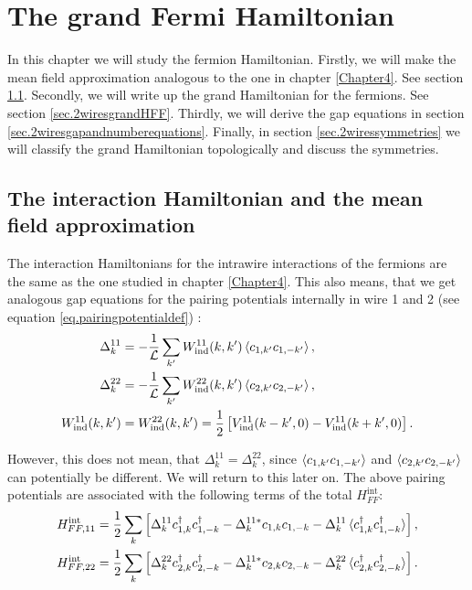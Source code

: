 
\chapter{The grand Fermi Hamiltonian} %

\label{Chapter9} %


In this chapter we will study the fermion Hamiltonian. Firstly, we will make the mean field approximation analogous to the one in chapter \ref{Chapter4}. See section \ref{sec.2wiresmeanfieldapproximation}. Secondly, we will write up the grand Hamiltonian for the fermions. See section \ref{sec.2wiresgrandHFF}. Thirdly, we will derive the gap equations in section \ref{sec.2wiresgapandnumberequations}. Finally, in section \ref{sec.2wiressymmetries} we will classify the grand Hamiltonian topologically and discuss the symmetries. 

\section{The interaction Hamiltonian and the mean field approximation}
\label{sec.2wiresmeanfieldapproximation}
The interaction Hamiltonians for the intrawire interactions of the fermions are the same as the one studied in chapter \ref{Chapter4}. This also means, that we get analogous gap equations for the pairing potentials internally in wire 1 and 2 (see equation \ref{eq.pairingpotentialdef}) :
\begin{align}
\Delta^{11}_k &= -\frac{1}{\mathcal{L}} \sum_{k'} W_{\text{ind}}^{11}(k,k')\braket{c_{1,k'}c_{1,-k'}}, \nonumber \\
\Delta^{22}_k &= -\frac{1}{\mathcal{L}} \sum_{k'} W_{\text{ind}}^{22}(k,k')\braket{c_{2,k'}c_{2,-k'}}, \nonumber \\
W_{\text{ind}}^{11}(k,k') &= W_{\text{ind}}^{22}(k,k') = \frac{1}{2}\left[V_{\text{ind}}^{11}(k-k',0) - V_{\text{ind}}^{11}(k+k',0) \right].
\label{eq.pairingpotentialsintrawire}
\end{align}

However, this does not mean, that $\Delta^{11}_k = \Delta^{22}_k$, since $\braket{c_{1,k'}c_{1,-k'}}$ and $\braket{c_{2,k'}c_{2,-k'}}$ can potentially be different. We will return to this later on. The above pairing potentials are associated with the following terms of the total $H^\text{int}_{FF}$:
\begin{align}
H^\text{int}_{FF,11} &= \frac{1}{2}\sum_k \left[\Delta^{11}_k c^\dagger_{1,k}c^\dagger_{1,-k} - \Delta^{11 *}_k c_{1,k}c_{1,-k} - \Delta^{11}_k\braket{c^\dagger_{1,k}c^\dagger_{1,-k}} \right], \nonumber \\
H^\text{int}_{FF,22} &= \frac{1}{2}\sum_k \left[\Delta^{22}_k c^\dagger_{2,k}c^\dagger_{2,-k} - \Delta^{11 *}_k c_{2,k}c_{2,-k} - \Delta^{22}_k\braket{c^\dagger_{2,k}c^\dagger_{2,-k}} \right].
\label{eq.Hintintrawire}
\end{align}

